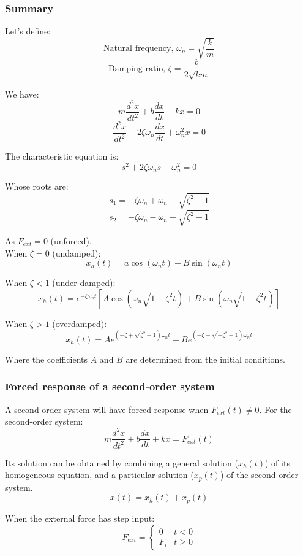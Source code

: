 \documentclass[11pt]{article}
\begin{document}
 \newpage
\subsubsection{Summary}
\label{sec:orgfc00ca3}
Let's define:
\[\text{Natural frequency, } \omega_n = \sqrt{\frac{k}{m}}\]
\[\text{Damping ratio, } \zeta = \frac{b}{2 \sqrt{km}}\]

We have:
\[m \frac{d^2 x}{dt^2} + b \frac{dx}{dt} + kx = 0\]
\[\frac{d^2 x}{dt^2} + 2 \zeta \omega_n \frac{dx}{dt} + \omega_n^2 x = 0\]

The characteristic equation is:
\[s^2 + 2 \zeta \omega_n s + \omega_n^2 = 0\]

Whose roots are:
\[s_1 = -\zeta \omega_n + \omega_n + \sqrt{\zeta^2 - 1}\]
\[s_2 = -\zeta \omega_n - \omega_n + \sqrt{\zeta^2 - 1}\]

As \(F_{ext} = 0\) (unforced).  \\

When \(\zeta = 0\) (undamped):
\[x_h (t) = a \cos (\omega_n t) + B \sin(\omega_n t)\]

When \(\zeta < 1\) (under damped):
\[x_h(t) = e^{-\zeta \omega_n t} \left[A \cos \left(\omega_n \sqrt{1 - \zeta^2 t} \right) + B \sin \left(\omega_n \sqrt{1 - \zeta^2 t} \right) \right]\]

When \(\zeta > 1\) (overdamped):
\[x_h (t) = Ae^{\left(- \zeta + \sqrt{\zeta^2 - 1} \right) \omega_n t} + Be^{\left( -\zeta - \sqrt{- \zeta^2 - 1} \right) \omega_n t}\]

Where the coefficients \(A\) and \(B\) are determined from the initial conditions.
\subsubsection{Forced response of a second-order system}
\label{sec:orgcae68b2}
A second-order system will have forced response when \(F_{ext} (t) \ne 0\). For the second-order system:
\[m \frac{d^2 x}{dt^2} + b \frac{dx}{dt} + kx = F_{ext} (t)\]

Its solution can be obtained by combining a general solution (\(x_h (t)\)) of its homogeneous equation, and a particular solution (\(x_p (t)\)) of the second-order system.
\[x(t) = x_h (t) + x_p (t)\]

When the external force has step input:
\begin{displaymath}
F_{ext} = \begin{cases}
0 & t < 0 \\
F_i & t \ge 0
\end{cases}
\end{displaymath}
\end{document}
